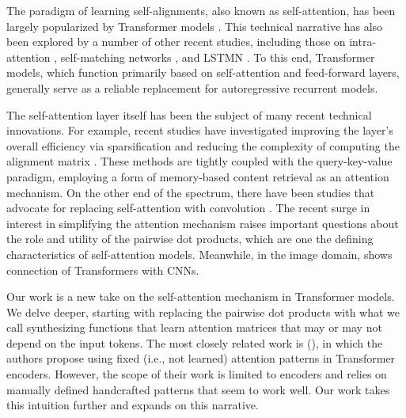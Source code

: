 The paradigm of learning self-alignments, also known as self-attention, has been largely popularized by Transformer models \citep{vaswani2017attention}. This technical narrative has also been explored by a number of other recent studies, including those on intra-attention \citep{parikh2016decomposable}, self-matching networks \citep{wang2017gated}, and LSTMN \citep{cheng2016long}. To this end, Transformer models, which function primarily based on self-attention and feed-forward layers, generally serve as a reliable replacement for autoregressive recurrent models. 

The self-attention layer itself has been the subject of many recent technical innovations. For example, recent studies have investigated improving the layer's overall efficiency via sparsification and reducing the complexity of computing the alignment matrix \citep{child2019generating,kitaev2020reformer,huang2018music,tay2020sparse,Beltagy2020Longformer}. These methods are tightly coupled with the query-key-value paradigm, employing a form of memory-based content retrieval as an attention mechanism. On the other end of the spectrum, there have been studies that advocate for replacing self-attention with convolution \citep{wu2019pay}. The recent surge in interest in simplifying the attention mechanism raises important questions about the role and  utility of the pairwise dot products, which are one the defining characteristics of self-attention models. Meanwhile, in the image domain, \citep{cordonnier2019relationship} shows connection of Transformers with CNNs.

Our work is a new take on the self-attention mechanism in Transformer models. We delve deeper, starting with replacing the pairwise dot products with what we call synthesizing functions that learn attention matrices that may or may not depend on the input tokens. The most closely related work is (\citep{raganato2020fixed}), in which the authors propose using fixed (i.e., not learned) attention patterns in Transformer encoders. However, the scope of their work is limited to encoders and relies on manually defined handcrafted patterns that seem to work well. Our work takes this intuition further and expands on this narrative.


